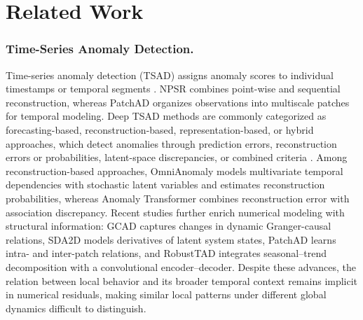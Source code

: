\documentclass[letterpaper]{article} %
\begin{document}
\section{Related Work}

\subsubsection{Time-Series Anomaly Detection.}

Time-series anomaly detection (TSAD) assigns anomaly scores to individual timestamps or temporal segments \cite{schmidl2022anomaly}. NPSR \cite{lai2023nominality} combines point-wise and sequential reconstruction, whereas PatchAD \cite{zhong2025patchad} organizes observations into multiscale patches for temporal modeling. Deep TSAD methods are commonly categorized as forecasting-based, reconstruction-based, representation-based, or hybrid approaches, which detect anomalies through prediction errors, reconstruction errors or probabilities, latent-space discrepancies, or combined criteria \cite{zamanzadeh2024deep}. Among reconstruction-based approaches, OmniAnomaly \cite{su2019robust} models multivariate temporal dependencies with stochastic latent variables and estimates reconstruction probabilities, whereas Anomaly Transformer \cite{xu2021anomaly} combines reconstruction error with association discrepancy. Recent studies further enrich numerical modeling with structural information: GCAD \cite{liu2025gcad} captures changes in dynamic Granger-causal relations, SDA2D \cite{sun2026state} models derivatives of latent system states, PatchAD \cite{zhong2025patchad} learns intra- and inter-patch relations, and RobustTAD \cite{gao2020robusttad} integrates seasonal--trend decomposition with a convolutional encoder--decoder. Despite these advances, the relation between local behavior and its broader temporal context remains implicit in numerical residuals, making similar local patterns under different global dynamics difficult to distinguish.
\end{document}
